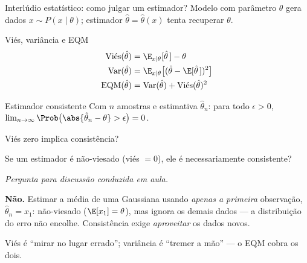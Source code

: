 \documentclass[aspectratio=169, 11pt]{beamer}
\newcommand{\paradiscussao}{\vspace{-0.2em}
  {\footnotesize\color{rlCinza}\itshape Pergunta para discussão conduzida em aula.}}
\begin{document}
\begin{frame}{Interlúdio estatístico: como julgar um estimador?}
  Modelo com parâmetro $\theta$ gera dados $x \sim P(x \mid \theta)$;
  estimador $\hat{\theta} = \hat{\theta}(x)$ tenta recuperar $\theta$.

  \begin{defbox}{Viés, variância e EQM}
    \vspace{-1.2em}
    \begin{align*}
      \text{Vi\'es}(\hat{\theta})
        &= \E_{x\mid\theta}[\hat{\theta}\,] - \theta\\
      \operatorname{Var}(\hat{\theta})
        &= \E_{x\mid\theta}\bigl[(\hat{\theta} - \E[\hat{\theta}\,])^2\bigr]\\
      \operatorname{EQM}(\hat{\theta})
        &= \operatorname{Var}(\hat{\theta})
          + \text{Vi\'es}(\hat{\theta})^2
    \end{align*}
  \end{defbox}

  \begin{defbox}{Estimador consistente}
    Com $n$ amostras e estimativa $\hat{\theta}_n$: para todo
    $\epsilon > 0$,\;
    $\lim_{n \to \infty} \Prob\bigl(\abs{\hat{\theta}_n - \theta} > \epsilon\bigr) = 0$.
  \end{defbox}
\end{frame}

\begin{frame}{Viés zero implica consistência?}
  \begin{quizbox}{}
    Se um estimador é não-viesado (viés $=0$), ele é necessariamente
    consistente?
  \end{quizbox}
  \paradiscussao

  \pause
  \begin{respbox}
    \textbf{Não.} Estimar a média de uma Gaussiana usando \emph{apenas a
    primeira} observação, $\hat{\theta}_n = x_1$: não-viesado
    ($\E[x_1] = \theta$), mas ignora os demais dados — a distribuição do
    erro não encolhe. Consistência exige \emph{aproveitar} os dados novos.
  \end{respbox}

  \begin{ideiabox}
    Viés é ``mirar no lugar errado''; variância é ``tremer a mão'' —
    o EQM cobra os dois.
  \end{ideiabox}
\end{frame}
\end{document}
